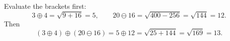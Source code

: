 Evaluate the brackets first:
\[3\oplus4=\sqrt{9+16}=5,\qquad 20\ominus16=\sqrt{400-256}=\sqrt{144}=12 .\]
Then
\[(3\oplus4)\oplus(20\ominus16)=5\oplus12=\sqrt{25+144}=\sqrt{169}=\boxed{13}.\]
